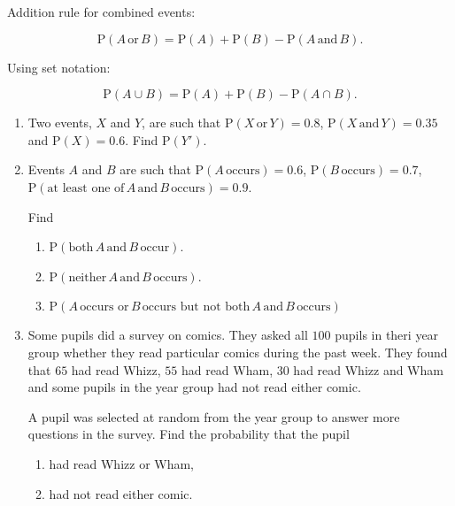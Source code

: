 \medskip

Addition rule for combined events:

\[
\text{P}(A\, \text{or} \, B) = \text{P}(A) +  \text{P}(B) - \text{P}(A\,\text{and}\, B).
\]

Using set notation:

\[
\text{P}(A\cup  B) = \text{P}(A) +  \text{P}(B) - \text{P}(A \cap B).
\]


\exercise  %

\begin{enumerate}
	\item Two events, $X$ and $Y$, are such that $\text{P}( X \, \text{or} \, Y) =0.8$, $\text{P}( X \, \text{and} \, Y) =0.35$ and $\text{P}( X ) =0.6$. Find $\text{P}(Y') $.
	
	\item Events $A$ and $B$ are such that $\text{P}(A \,\text{occurs})=0.6$,  $\text{P}(B \,\text{occurs})=0.7$, $\text{P}(\text{at least one of}\, A \, \text{and}\, B \, \text{occurs})=0.9$.
	
	Find 
	\begin{enumerate}
		\item $\text{P}(\text{both}\, A \, \text{and}\, B \, \text{occur})$.
		\item $\text{P}(\text{neither}\, A \, \text{and}\, B \, \text{occurs})$.
		\item $\text{P}( A \, \text{occurs or}\, B \, \text{occurs but not both} \, A \, \text{and}\, B \, \text{occurs})$
	\end{enumerate}
	
	
	\item   Some pupils did a survey on comics. They asked all $100$ pupils in theri year group whether they read particular comics during the past week. They found that $65$ had read Whizz, $55$ had read Wham, $30$ had read Whizz and Wham and some pupils  in the year group had not read either comic.
	
	A pupil was selected at random from the year group to answer more questions in the survey. Find the probability that the pupil
	
	\begin{enumerate}
		\item had read Whizz or Wham,
		\item had not read either comic.
	\end{enumerate}




\end{enumerate}

